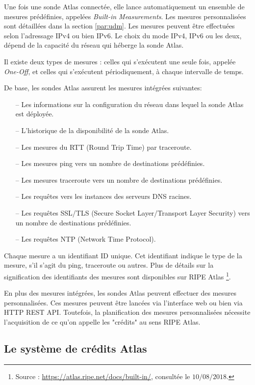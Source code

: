 Une fois une sonde  Atlas connectée, elle lance automatiquement un ensemble de mesures prédéfinies, appelées \textit{Built-in Measurements}. Les mesures personnalisées sont détaillées dans la section \ref{par:udm}. Les mesures peuvent être effectuées selon l'adressage IPv4 ou bien IPv6. Le choix du mode  IPv4,  IPv6 ou les deux, dépend de la capacité du réseau qui héberge la sonde  Atlas.  

Il existe deux types de mesures :  celles qui   s'exécutent une seule fois, appelée  \textit{One-Off}, et celles qui s'exécutent   périodiquement, à chaque intervalle de temps. 

De base, les sondes Atlas assurent les mesures intégrées  suivantes: 

\begin{itemize}
	\item[--] Les informations sur la configuration du réseau dans lequel la sonde Atlas est déployée.
	\item[--] L'historique de la disponibilité de la sonde Atlas.
	\item[--] Les mesures du  RTT (Round Trip Time) par traceroute.
	\item[--] Les mesures ping vers un nombre de destinations prédéfinies.
	\item[--] Les mesures traceroute vers un nombre de destinations prédéfinies.
	\item[--] Les requêtes vers les instances des serveurs DNS  racines.
	\item[--] Les requêtes SSL/TLS (Secure Socket Layer/Transport Layer Security) vers un nombre de destinations prédéfinies.
	\item[--] Les requêtes NTP (Network Time Protocol).
\end{itemize}

Chaque mesure a un identifiant ID unique. Cet identifiant indique le type de la mesure, s'il s'agit du ping, traceroute ou autres. Plus de détails sur la signification des identifiants des mesures sont disponibles sur RIPE Atlas \footnote{Source : \url{https://atlas.ripe.net/docs/built-in/}, consultée le $10/08/2018$.}.

En plus des mesures intégrées, les sondes Atlas peuvent effectuer des mesures personnalisées. Ces mesures peuvent être lancées via l'interface web \cite{create-UDM} ou bien via  HTTP REST API. Toutefois, la planification des  mesures personnalisées nécessite l'acquisition de ce qu'on appelle les "crédits" au sens RIPE Atlas.  

\subsection{Le système de crédits Atlas} \label{credits-atlas}

